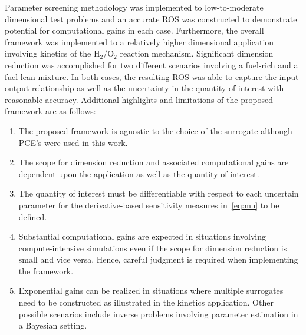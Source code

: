 Parameter screening methodology was implemented to low-to-moderate dimensional test problems
and an accurate ROS was constructed to demonstrate potential for computational gains in
each case. Furthermore, the overall framework was implemented  to a relatively higher 
dimensional application involving kinetics of the H$_2$/O$_2$ reaction mechanism. 
Significant dimension reduction was accomplished for two different scenarios involving
a fuel-rich and a fuel-lean mixture. In both cases, the resulting ROS was able to capture
the input-output relationship as well as the uncertainty in the quantity of interest with 
reasonable accuracy. Additional highlights and limitations of the proposed framework are as follows:
\begin{enumerate}
\item The proposed framework is agnostic to the choice of the surrogate although PCE's were used
in this work. 
\item The scope for dimension reduction and associated computational gains are
dependent upon the application as well as the quantity of interest. 
\item The quantity of interest must be differentiable with respect to each uncertain parameter
for the derivative-based sensitivity measures in~\eqref{eq:mu} to be defined. 
\item Substantial computational gains are expected in situations involving compute-intensive
simulations even if the scope for dimension reduction is small and vice versa. Hence, careful judgment 
is required when implementing the framework. 
\item Exponential gains can be realized in situations where multiple surrogates need to be
constructed as illustrated in the kinetics application. Other possible scenarios 
include inverse problems involving parameter estimation in a Bayesian setting. 
\end{enumerate}

